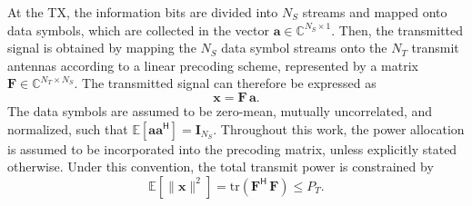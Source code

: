 At the \ac{TX}, the information bits are divided into $N_S$ streams and mapped onto data symbols, which are collected in the vector $\mathbf{a} \in \mathbb{C}^{N_S \times 1}$.
Then, the transmitted signal is obtained by mapping the $N_S$ data symbol streams onto the $N_T$ transmit antennas according to a linear precoding scheme, represented by a matrix $\mathbf{F} \in \mathbb{C}^{N_T \times N_S}$.
The transmitted signal can therefore be expressed as
\begin{equation}
\label{eq:su_mimo_precoding}
    \mathbf{x} = \mathbf{F} \, \mathbf{a}.
\end{equation}
The data symbols are assumed to be zero-mean, mutually uncorrelated, and normalized, such that $ \mathbb{E}\!\left[\mathbf{a}\mathbf{a}^{\mathsf{H}}\right] = \mathbf{I}_{N_S} $.
Throughout this work, the power allocation is assumed to be incorporated into the precoding matrix, unless explicitly stated otherwise. Under this convention, the total transmit power is constrained by
\begin{equation}
\label{eq:su_mimo_power_constraint}
    \mathbb{E}\!\left[\|\mathbf{x}\|^2\right] = \mathrm{tr}\!\left(\mathbf{F}^{\mathsf{H}} \, \mathbf{F}\right) \leq P_T.
\end{equation}

